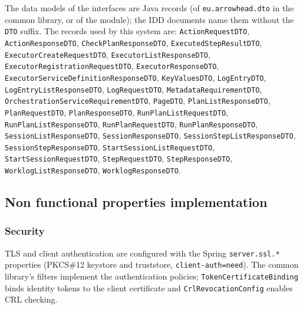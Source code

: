\documentclass[a4paper]{arrowhead}
\begin{document}
The data models of the interfaces are Java records (of \texttt{eu.arrowhead.dto} in the common library, or of the module); the IDD documents name them without the \texttt{DTO} suffix. The records used by this system are: \texttt{ActionRequestDTO}, \texttt{ActionResponseDTO}, \texttt{Check\allowbreak{}Plan\allowbreak{}Response\allowbreak{}DTO}, \texttt{Executed\allowbreak{}Step\allowbreak{}Result\allowbreak{}DTO}, \texttt{Executor\allowbreak{}Create\allowbreak{}Request\allowbreak{}DTO}, \texttt{Executor\allowbreak{}List\allowbreak{}Response\allowbreak{}DTO}, \texttt{Executor\allowbreak{}Registration\allowbreak{}Request\allowbreak{}DTO}, \texttt{Executor\allowbreak{}Response\allowbreak{}DTO}, \texttt{Executor\allowbreak{}Service\allowbreak{}Definition\allowbreak{}Response\allowbreak{}DTO}, \texttt{KeyValuesDTO}, \texttt{LogEntryDTO}, \texttt{Log\allowbreak{}Entry\allowbreak{}List\allowbreak{}Response\allowbreak{}DTO}, \texttt{LogRequestDTO}, \texttt{Metadata\allowbreak{}Requirement\allowbreak{}DTO}, \texttt{Orchestration\allowbreak{}Service\allowbreak{}Requirement\allowbreak{}DTO}, \texttt{PageDTO}, \texttt{Plan\allowbreak{}List\allowbreak{}Response\allowbreak{}DTO}, \texttt{PlanRequestDTO}, \texttt{PlanResponseDTO}, \texttt{Run\allowbreak{}Plan\allowbreak{}List\allowbreak{}Request\allowbreak{}DTO}, \texttt{Run\allowbreak{}Plan\allowbreak{}List\allowbreak{}Response\allowbreak{}DTO}, \texttt{RunPlanRequestDTO}, \texttt{RunPlanResponseDTO}, \texttt{Session\allowbreak{}List\allowbreak{}Response\allowbreak{}DTO}, \texttt{SessionResponseDTO}, \texttt{Session\allowbreak{}Step\allowbreak{}List\allowbreak{}Response\allowbreak{}DTO}, \texttt{Session\allowbreak{}Step\allowbreak{}Response\allowbreak{}DTO}, \texttt{Start\allowbreak{}Session\allowbreak{}List\allowbreak{}Request\allowbreak{}DTO}, \texttt{Start\allowbreak{}Session\allowbreak{}Request\allowbreak{}DTO}, \texttt{StepRequestDTO}, \texttt{StepResponseDTO}, \texttt{Worklog\allowbreak{}List\allowbreak{}Response\allowbreak{}DTO}, \texttt{WorklogResponseDTO}.

\subsection{Non functional properties implementation}

\subsubsection{Security}

TLS and client authentication are configured with the Spring \texttt{server.\allowbreak{}ssl.\allowbreak{}*} properties (PKCS\#12 keystore and truststore, \texttt{client-\allowbreak{}auth=\allowbreak{}need}). The common library's filters implement the authentication policies; \texttt{Token\allowbreak{}Certificate\allowbreak{}Binding} binds identity tokens to the client certificate and \texttt{Crl\allowbreak{}Revocation\allowbreak{}Config} enables CRL checking.
\end{document}
